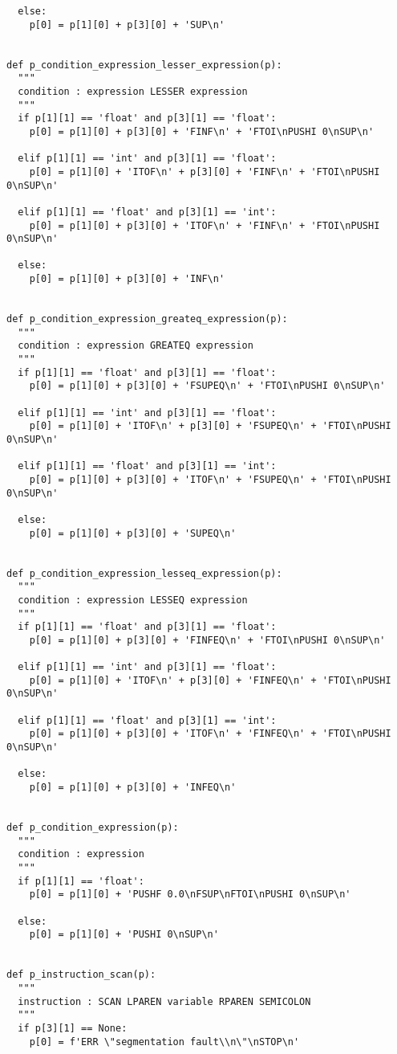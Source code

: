 \documentclass[11pt,a4paper]{report}%
\begin{document}
\begin{scriptsize}
\begin{verbatim}
  else:
    p[0] = p[1][0] + p[3][0] + 'SUP\n'


def p_condition_expression_lesser_expression(p):
  """
  condition : expression LESSER expression
  """
  if p[1][1] == 'float' and p[3][1] == 'float':
    p[0] = p[1][0] + p[3][0] + 'FINF\n' + 'FTOI\nPUSHI 0\nSUP\n'

  elif p[1][1] == 'int' and p[3][1] == 'float':
    p[0] = p[1][0] + 'ITOF\n' + p[3][0] + 'FINF\n' + 'FTOI\nPUSHI 0\nSUP\n'
  
  elif p[1][1] == 'float' and p[3][1] == 'int':
    p[0] = p[1][0] + p[3][0] + 'ITOF\n' + 'FINF\n' + 'FTOI\nPUSHI 0\nSUP\n'

  else:
    p[0] = p[1][0] + p[3][0] + 'INF\n'


def p_condition_expression_greateq_expression(p):
  """
  condition : expression GREATEQ expression
  """
  if p[1][1] == 'float' and p[3][1] == 'float':
    p[0] = p[1][0] + p[3][0] + 'FSUPEQ\n' + 'FTOI\nPUSHI 0\nSUP\n'

  elif p[1][1] == 'int' and p[3][1] == 'float':
    p[0] = p[1][0] + 'ITOF\n' + p[3][0] + 'FSUPEQ\n' + 'FTOI\nPUSHI 0\nSUP\n'
  
  elif p[1][1] == 'float' and p[3][1] == 'int':
    p[0] = p[1][0] + p[3][0] + 'ITOF\n' + 'FSUPEQ\n' + 'FTOI\nPUSHI 0\nSUP\n'

  else:
    p[0] = p[1][0] + p[3][0] + 'SUPEQ\n'


def p_condition_expression_lesseq_expression(p):
  """
  condition : expression LESSEQ expression
  """
  if p[1][1] == 'float' and p[3][1] == 'float':
    p[0] = p[1][0] + p[3][0] + 'FINFEQ\n' + 'FTOI\nPUSHI 0\nSUP\n'

  elif p[1][1] == 'int' and p[3][1] == 'float':
    p[0] = p[1][0] + 'ITOF\n' + p[3][0] + 'FINFEQ\n' + 'FTOI\nPUSHI 0\nSUP\n'
  
  elif p[1][1] == 'float' and p[3][1] == 'int':
    p[0] = p[1][0] + p[3][0] + 'ITOF\n' + 'FINFEQ\n' + 'FTOI\nPUSHI 0\nSUP\n'

  else:
    p[0] = p[1][0] + p[3][0] + 'INFEQ\n'


def p_condition_expression(p):
  """
  condition : expression
  """
  if p[1][1] == 'float':
    p[0] = p[1][0] + 'PUSHF 0.0\nFSUP\nFTOI\nPUSHI 0\nSUP\n'
  
  else:
    p[0] = p[1][0] + 'PUSHI 0\nSUP\n'


def p_instruction_scan(p):
  """
  instruction : SCAN LPAREN variable RPAREN SEMICOLON
  """
  if p[3][1] == None:
    p[0] = f'ERR \"segmentation fault\\n\"\nSTOP\n'
  

\end{verbatim}
\end{scriptsize}
\end{document}
